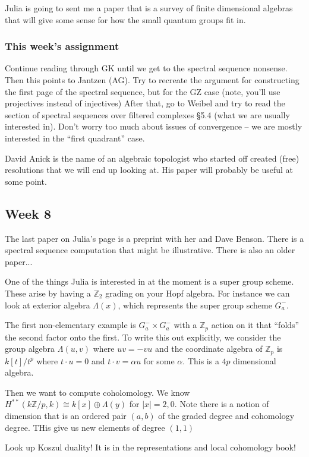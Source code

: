\documentclass[12pt]{article}
\theoremstyle{nonumberbreak}
\theoremstyle{changebreak}
\theoremstyle{nonumberplain}
\theoremstyle{change}
\newcommand*{\bbZ}{\mathbb{Z}}
\begin{document}
Julia is going to sent me a paper that is a survey of finite dimensional algebras that will give some sense for how the small quantum groups fit in.

\subsubsection{This week's assignment}
Continue reading through GK until we get to the spectral sequence nonsense. Then this points to Jantzen (AG). Try to recreate the
argument for constructing the first page of the spectral sequence, but for the GZ case (note, you'll use projectives instead of injectives)
After that, go to Weibel and try to read the section of spectral sequences over filtered complexes \S 5.4 (what we are usually interested in).
Don't worry too much about issues of convergence -- we are mostly interested in the ``first quadrant'' case.

David Anick is the name of an algebraic topologist who started off created (free) resolutions that we will end up looking at. 
His paper \cite{anick-resolution} will probably be useful at some point.

\subsection{Week 8}
The last paper on Julia's page is a preprint with her and Dave Benson. There is a spectral sequence computation that might be illustrative.
There is also an older paper...

One of the things Julia is interested in at the moment is a super group scheme. These arise by having a $\bbZ_2$ grading on your Hopf algebra.
For instance we can look at exterior algebra $\Lambda(x)$, which represents the super group scheme $G_a^-$. 

The first non-elementary example is $G_a^-\times G_a^-$ with a $\bbZ_p$ action on it that ``folds'' the second factor
onto the first. To write this out explicitly, we consider the group algebra $\Lambda(u,v)$ where $uv=-vu$ and the coordinate algebra of $\bbZ_p$
is $k[t]/t^p$ where $t\cdot u=0$ and $t\cdot v=\alpha u$ for some $\alpha$. This is a $4p$ dimensional algebra.

Then we want to compute coholomology. We know $H^{**}(k\bbZ/p,k)\cong k[x]\oplus\Lambda(y)$ for $|x|=2,0$.
Note there is a notion of dimension that is an ordered pair $(a,b)$ of the graded degree and cohomology degree.
THis give us new elements of degree $(1,1)$

Look up Koszul duality! It is in the representations and local cohomology book! 
\end{document}
